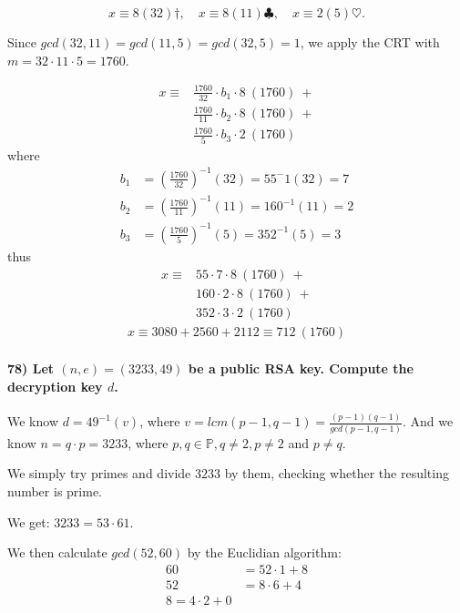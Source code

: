 \documentclass[
]{article}
\begin{document}
\[
x \equiv 8(32) \mathit{\dagger}, 
\quad x \equiv 8(11)\clubsuit, 
\quad x \equiv 2 (5) \heartsuit.
\]

Since \(gcd(32,11) = gcd(11,5) = gcd(32,5) = 1\), we apply the CRT with
\(m = 32 \cdot 11 \cdot 5 = 1760\).

\[
\begin{aligned}
x \equiv &\frac{1760}{32} \cdot b_1 \cdot 8 \ (1760) \ + \\
&\frac{1760}{11} \cdot b_2 \cdot 8 \ (1760) \ + \\
&\frac{1760}{5} \cdot b_3 \cdot 2 \ (1760)
\end{aligned}
\] where \[
\begin{aligned}
b_1 &= (\frac{1760}{32})^{-1} (32) = 55^-1 (32)  = 7\\
b_2 &= (\frac{1760}{11})^{-1} (11) = 160^{-1} (11) = 2\\
b_3 &= (\frac{1760}{5})^{-1} (5) = 352^{-1} (5) = 3
\end{aligned}
\] thus \[
\begin{aligned}
x \equiv &55 \cdot 7 \cdot 8 \ (1760) \ + \\
&160 \cdot 2 \cdot 8 \ (1760) \ + \\
&352 \cdot 3 \cdot 2 \ (1760)
\end{aligned}
\] \[
\begin{aligned}
x \equiv 3080 + 2560 + 2112 \equiv 712 \ (1760)
\end{aligned}
\]

\hypertarget{let-ne-323349-be-a-public-rsa-key.-compute-the-decryption-key-d.}{%
\paragraph{\texorpdfstring{78) Let \((n,e) = (3233,49)\) be a public RSA
key. Compute the decryption key
\(d\).}{78) Let (n,e) = (3233,49) be a public RSA key. Compute the decryption key d.}}\label{let-ne-323349-be-a-public-rsa-key.-compute-the-decryption-key-d.}}

We know \(d = 49^{-1} (v)\), where
\(v = lcm(p-1, q-1) = \frac{(p-1)(q-1)}{gcd(p-1,q-1)}\). And we know
\(n = q\cdot p= 3233\), where \(p,q \in \mathbb{P}, q \neq 2, p \neq 2\)
and \(p \neq q\).

We simply try primes and divide \(3233\) by them, checking whether the
resulting number is prime.

We get: \(3233 = 53 \cdot 61\).

We then calculate \(gcd(52,60)\) by the Euclidian algorithm: \[
\begin{aligned}
60 &= 52 \cdot 1 + 8\\
52 &= 8 \cdot 6 + 4\\
8 = 4 \cdot 2 + 0
\end{aligned}
\]
\end{document}
